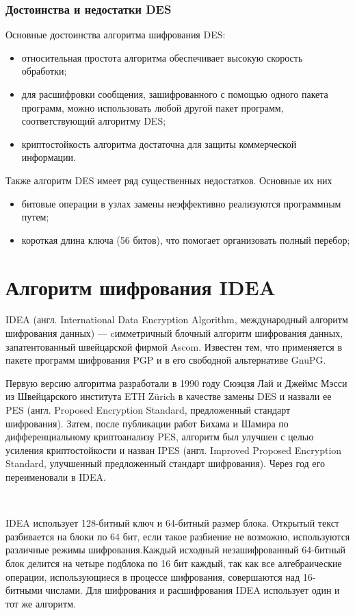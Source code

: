 \documentclass[a4paper]{report}
\begin{document}
\subsubsection{Достоинства и недостатки DES}
Основные достоинства алгоритма шифрования DES:
\begin{itemize}
\item относительная простота алгоритма обеспечивает высокую скорость\\ обработки;
\item для расшифровки сообщения, зашифрованного с помощью одного пакета программ, можно использовать любой другой пакет программ, соответствующий алгоритму DES;
\item криптостойкость алгоритма достаточна для защиты коммерческой \\ информации.
\end{itemize}

Также алгоритм DES имеет ряд существенных недостатков. Основные их них 
\begin{itemize}
\item битовые операции в узлах замены неэффективно реализуются программ­ным путем;
\item  короткая длина ключа (56 битов), что помогает организо­вать полный перебор;
\end{itemize}

\section{Алгоритм шифрования IDEA}
IDEA (англ. International Data Encryption Algorithm, международный алгоритм шифрования данных) — cимметричный блочный алгоритм шифрования данных, запатентованный швейцарской фирмой Ascom. Известен тем, что применяется в пакете программ шифрования PGP и в его свободной альтернативе GnuPG.

Первую версию алгоритма разработали в 1990 году Сюэцзя Лай и Джеймс Мэсси из Швейцарского института ETH Zürich в качестве замены DES и назвали ее PES (англ. Proposed Encryption Standard, предложенный стандарт шифрования). Затем, после публикации работ Бихама и Шамира по дифференциальному криптоанализу PES, алгоритм был улучшен с целью усиления криптостойкости и назван IPES (англ. Improved Proposed Encryption Standard, улучшенный предложенный стандарт шифрования). Через год его переименовали в IDEA.

~

IDEA использует 128-битный ключ и 64-битный размер блока. Открытый текст разбивается на блоки по 64 бит, если такое разбиение не возможно, используются различные режимы шифрования.Каждый исходный незашифрованный 64-битный блок делится на четыре подблока по 16 бит каждый, так как все алгебраические операции, использующиеся в процессе шифрования, совершаются над 16-битными числами. Для шифрования и расшифрования IDEA использует один и тот же алгоритм.
\end{document}

